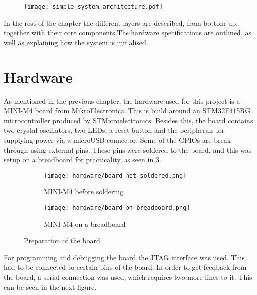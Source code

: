  
\begin{figure}[H]
\centering
\texttt{[image: simple\_system\_architecture.pdf]}
\end{figure}


In the rest of the chapter the different layers are described,
from bottom up, 
together with their core components.The hardware specifications
are outlined, as well as explaining how the system is initialised.


\section{Hardware}
As mentioned in the previous chapter, the hardware used for this project 
is a MINI-M4 board from MikroElectronica. This is build around an
STM32F415RG microcontroller produced by STMicroelectronics. Besides
this, the board contains two crystal oscillators, two LEDs, a reset 
button and the peripherals for supplying power via a microUSB connector.
Some of the GPIOs are break through using external pins.
These pins were soldered to the board, and this was setup on a breadboard
for practicality, as seen in \ref{fig:photo1}.

\begin{figure}[H]
\begin{subfigure}{0.5\textwidth}
  \centering
  \texttt{[image: hardware/board\_not\_soldered.png]}
  \caption{MINI-M4 before soldernig}
  \label{fig:sub1}
\end{subfigure}%
\begin{subfigure}{0.5\textwidth}
  \centering
  \texttt{[image: hardware/board\_on\_breadboard.png]}
  \caption{MINI-M4 on a breadboard}
  \label{fig:sub2}
\end{subfigure}
\caption{Preparation of the board}
\label{fig:photo1}
\end{figure}

For programming and debugging the board the JTAG interface was used.
This had to be connected to certain pins of the board. In order to get 
feedback from the board, a serial connection was used, which requires two
more lines to it. This can be seen in the next figure.

